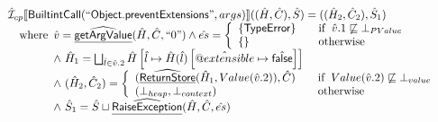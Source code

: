 \documentclass{article}
\makeatletter
\newcommand{\SF}[1]{\mbox{\textsf{#1}}}
\newcommand{\wherec}[1]{{\rm where}\begin{array}[t]{l}#1\end{array}}
\newcommand{\ifc}[1]{{\rm if}\begin{array}[t]{l}#1\end{array}}
\newcommand{\owc}{{\rm otherwise}}
\newcommand{\aI}{\hat{\mathcal{I}}}
\newcommand{\lbr}{\llbracket}
\newcommand{\rbr}{\rrbracket}
\newcommand{\ahf}[1]{\widehat{\underline{\sf #1}}}
\newcommand{\avarprop}[1]{\hat{@#1}}
\newcommand{\afalse}{\hat{\SF{false}}}
\makeatother
\begin{document}
\[\begin{array}{ll}
\aI _{cp}\lbr \SF{BuiltintCall}(``\SF{Object.preventExtensions}",args)\rbr((\hat{H},\hat{C}), \hat{S})
  = ((\hat{H}_2, \hat{C}_2), \hat{S}_1)\\
\quad\wherec{
 \hat{v} =\ahf{getArgValue}(\hat{H}, \hat{C}, ``0")
  \land \hat{es} =
    \left\{
    \begin{array}{l@{\quad\quad}l}
      \{ \SF{TypeError} \} & \ifc{\hat{v}.1 \not\sqsubseteq \bot_{PValue}}\\
      \{ \}& \owc\\
    \end{array}
    \right.\\
  \land\ \hat{H}_1 = \bigsqcup_{\hat{l} \in \hat{v}.2} \hat{H}
    \left[\hat{l} \mapsto \hat{H}(\hat{l})
      \left[\avarprop{extensible} \mapsto \afalse\right]\right]\\
  \land\ (\hat{H}_2, \hat{C}_2) = 
    \left\{\begin{array}{l@{\quad\quad}l}
      (\ahf{ReturnStore}(\hat{H}_1, Value(\hat{v}.2)), \hat{C})
      & \ifc{Value(\hat{v}.2) \not\sqsubseteq \bot_{value}}\\
      (\bot_{heap}, \bot_{context}) & \owc \\
    \end{array}\right.\\
  \land\ \hat{S}_1 = \hat{S} \sqcup \ahf{RaiseException}(\hat{H}, \hat{C}, \hat{es})\\
  }\\
\\\\ 


\end{array}
\]
\end{document}
